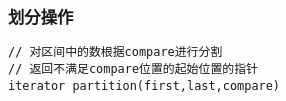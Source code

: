 \subsubsection{划分操作}
\begin{lstlisting}
// 对区间中的数根据compare进行分割
// 返回不满足compare位置的起始位置的指针
iterator partition(first,last,compare)
\end{lstlisting}